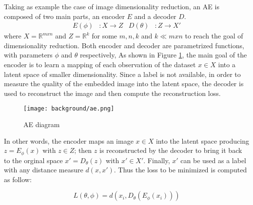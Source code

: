 Taking as example the case of image dimensionality reduction, an AE is composed of two main parts, an encoder $E$ and a decoder $D$. 
\begin{align}
  E(\phi) &:  X \rightarrow Z & D(\theta) &:  Z \rightarrow X'
\end{align}
where $X = \mathbb{R}^{mxn}$ and $Z = \mathbb{R}^{k }$ for some $m,n,k$ and $k\ll mxn$ to reach the goal of dimensionality reduction. Both encoder and decoder are parametrized functions, with parameters $\phi$ and $\theta$ respectively,
As shown in Figure \ref{fig:ae}, the main goal of the encoder is to learn a mapping of each observation of the dataset $x \in X$ into a latent space of smaller dimensionality.  Since a label is not available, in order to measure the quality of the embedded image into the latent space, the decoder is used to reconstruct the image and then compute the reconstruction loss.

\begin{figure}[h]
  \begin{center}
    \texttt{[image: background/ae.png]}
  \end{center}
  \caption{AE diagram}
  \label{fig:ae}
\end{figure}

In other words, the encoder maps an image $x\in X$ into the latent space producing ${z=E_{\phi }(x)}$ with $z\in Z$; then $z$ is reconstructed by the decoder to bring it back to the orginal space ${x'=D_{\theta }(z)}$ with $x'\in X'$. Finally, $x'$ can be used as a label with any distance measure $d(x,x')$. Thus the loss to be minimized is computed as follow:

\begin{equation}
\label{eq:aeloss}
  L(\theta ,\phi ) = d(x_{i},D_{\theta }(E_{\phi }(x_{i})))
\end{equation}


